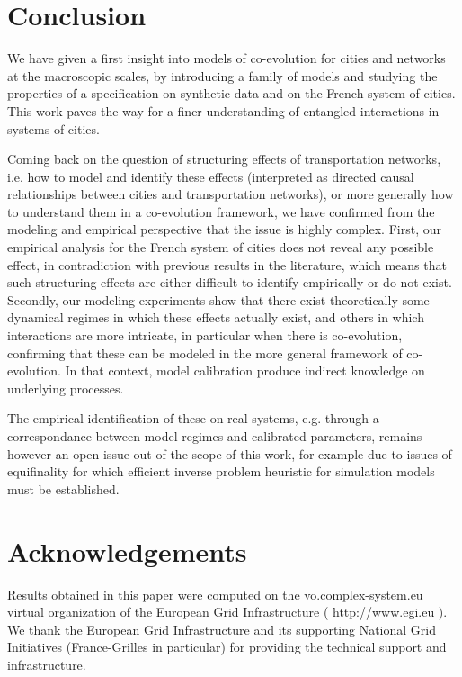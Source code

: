 \documentclass[11pt]{article}
\begin{document}
\section*{Conclusion}

We have given a first insight into models of co-evolution for cities and networks at the macroscopic scales, by introducing a family of models and studying the properties of a specification on synthetic data and on the French system of cities. This work paves the way for a finer understanding of entangled interactions in systems of cities.

Coming back on the question of structuring effects of transportation networks, i.e. how to model and identify these effects (interpreted as directed causal relationships between cities and transportation networks), or more generally how to understand them in a co-evolution framework, we have confirmed from the modeling and empirical perspective that the issue is highly complex. First, our empirical analysis for the French system of cities does not reveal any possible effect, in contradiction with previous results in the literature, which means that such structuring effects are either difficult to identify empirically or do not exist. Secondly, our modeling experiments show that there exist theoretically some dynamical regimes in which these effects actually exist, and others in which interactions are more intricate, in particular when there is co-evolution, confirming that these can be modeled in the more general framework of co-evolution. In that context, model calibration produce indirect knowledge on underlying processes.


The empirical identification of these on real systems, e.g. through a correspondance between model regimes and calibrated parameters, remains however an open issue out of the scope of this work, for example due to issues of equifinality for which efficient inverse problem heuristic for simulation models must be established.






\section*{Acknowledgements}

Results obtained in this paper were computed on the vo.complex-system.eu virtual organization of the European Grid Infrastructure ( http://www.egi.eu ). We thank the European Grid Infrastructure and its supporting National Grid Initiatives (France-Grilles in particular) for providing the technical support and infrastructure.
\end{document}

